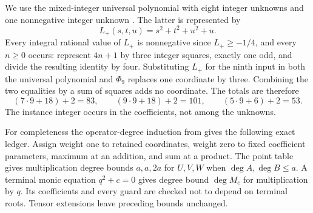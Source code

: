\documentclass[11pt]{article}
\begin{document}
We use the mixed-integer universal polynomial with eight
integer unknowns and one nonnegative integer unknown
\cite[Theorem 1.1(i)]{SunHTP}. The latter is represented by
\[
                         L_+(s,t,u)=s^2+t^2+u^2+u.
\]
Every integral rational value of \(L_+\) is nonnegative since
\(L_+\ge-1/4\), and every \(n\ge0\) occurs: represent
\(4n+1\) by three integer squares, exactly one odd, and
divide the resulting identity by four. Substituting \(L_+\)
for the ninth input in both the universal polynomial and
\(\Phi_9\) replaces one coordinate by three. Combining the
two equalities by a sum of squares adds no coordinate.
The totals are therefore
\[
                 (7\cdot9+18)+2=83,\qquad
                 (9\cdot9+18)+2=101,\qquad
                 (5\cdot9+6)+2=53.
\]
The instance integer occurs in the coefficients, not among
the unknowns.

For completeness the operator-degree induction from
\cite{shared} gives the following exact ledger.
Assign weight one to retained coordinates, weight zero to
fixed coefficient parameters, maximum at an addition, and
sum at a product. The point table gives multiplication
degree bounds \(a,a,2a\) for \(U,V,W\) when
\(\deg A,\deg B\le a\). A terminal monic equation
\(q^2+c=0\) gives degree bound \(\deg M_c\) for
multiplication by \(q\). Its coefficients and every guard
are checked not to depend on terminal roots. Tensor
extensions leave preceding bounds unchanged.
\end{document}
